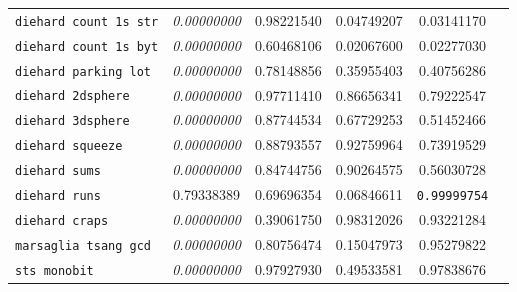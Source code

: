\documentclass[11pt]{report}
\begin{document}
\begin{appendices}
\begin{center}
\begin{tabular}{lccccc}
    \verb|diehard count 1s str| & \textit{\textcolor{FAILED}{0.00000000}}   & \textcolor{PASSED}{0.98221540}            & \textcolor{PASSED}{0.04749207}            & \textcolor{PASSED}{0.03141170}            \\
    \verb|diehard count 1s byt| & \textit{\textcolor{FAILED}{0.00000000}}   & \textcolor{PASSED}{0.60468106}            & \textcolor{PASSED}{0.02067600}            & \textcolor{PASSED}{0.02277030}            \\
    \verb|diehard parking lot|  & \textit{\textcolor{FAILED}{0.00000000}}   & \textcolor{PASSED}{0.78148856}            & \textcolor{PASSED}{0.35955403}            & \textcolor{PASSED}{0.40756286}            \\
    \verb|diehard 2dsphere|     & \textit{\textcolor{FAILED}{0.00000000}}   & \textcolor{PASSED}{0.97711410}            & \textcolor{PASSED}{0.86656341}            & \textcolor{PASSED}{0.79222547}            \\
    \verb|diehard 3dsphere|     & \textit{\textcolor{FAILED}{0.00000000}}   & \textcolor{PASSED}{0.87744534}            & \textcolor{PASSED}{0.67729253}            & \textcolor{PASSED}{0.51452466}            \\
    \verb|diehard squeeze|      & \textit{\textcolor{FAILED}{0.00000000}}   & \textcolor{PASSED}{0.88793557}            & \textcolor{PASSED}{0.92759964}            & \textcolor{PASSED}{0.73919529}            \\
    \verb|diehard sums|         & \textit{\textcolor{FAILED}{0.00000000}}   & \textcolor{PASSED}{0.84744756}            & \textcolor{PASSED}{0.90264575}            & \textcolor{PASSED}{0.56030728}            \\
    \verb|diehard runs|         & \textcolor{PASSED}{0.79338389}            & \textcolor{PASSED}{0.69696354}            & \textcolor{PASSED}{0.06846611}            & \texttt{\textcolor{WEAK}{0.99999754}}              \\
    \verb|diehard craps|        & \textit{\textcolor{FAILED}{0.00000000}}   & \textcolor{PASSED}{0.39061750}            & \textcolor{PASSED}{0.98312026}            & \textcolor{PASSED}{0.93221284}            \\
    \verb|marsaglia tsang gcd|  & \textit{\textcolor{FAILED}{0.00000000}}   & \textcolor{PASSED}{0.80756474}            & \textcolor{PASSED}{0.15047973}            & \textcolor{PASSED}{0.95279822}            \\
    \verb|sts monobit|          & \textit{\textcolor{FAILED}{0.00000000}}   & \textcolor{PASSED}{0.97927930}            & \textcolor{PASSED}{0.49533581}            & \textcolor{PASSED}{0.97838676}            \\

\end{tabular}
\end{center}
\end{appendices}
\end{document}
